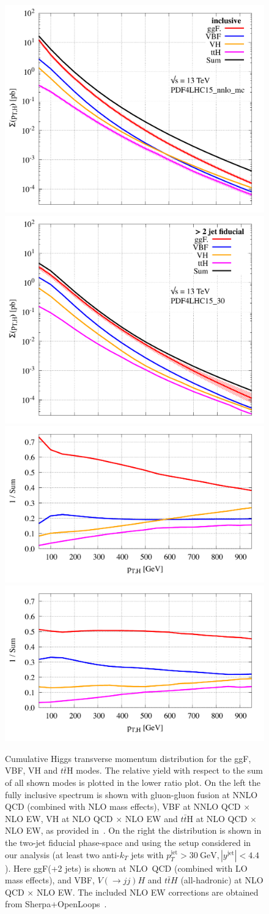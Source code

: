 \documentclass[10pt,prd,fleqn,superscriptaddress,notitlepage,nofootinbib,preprintnumbers,nobalancelastpage]{revtex4-1}
\newcommand{\VBF}{VBF\xspace}
\newcommand{\VH}{VH\xspace}
\begin{document}
\begin{figure}[t!]
\centering
\includegraphics[width=.45\textwidth]{figures/pTH_incl.pdf}
\includegraphics[width=.45\textwidth]{figures/pTH_fid.pdf}
\\\vspace{-1.1em}
\includegraphics[width=.45\textwidth]{figures/pTH_incl-ratio.pdf}
\includegraphics[width=.45\textwidth]{figures/pTH_fid-ratio.pdf}
\caption{Cumulative Higgs transverse momentum distribution for the ggF, \VBF, \VH and $t\bar{t}$H modes. The relative yield with respect to the sum of all shown modes is plotted in the lower ratio plot. On the left the fully inclusive spectrum is shown with gluon-gluon fusion at NNLO QCD (combined with NLO mass effects), \VBF at NNLO QCD $\times$ NLO EW, \VH at NLO QCD $\times$ NLO EW and $t\bar{t}$H at NLO QCD $\times$ NLO EW, as provided in~\cite{Becker:2020rjp}. On the right the
distribution is shown in the two-jet fiducial phase-space and using the setup considered in our analysis (at least two anti-$k_T$ jets with $p_T^{\text{jet}} > 30\ \text{GeV},  |y^{\text{jet}}|<4.4$). Here ggF(+2 jets) is shown at NLO~QCD (combined with LO mass effects), and \VBF, $V(\to jj)H$ and $t\bar{t}H$ (all-hadronic) at NLO QCD $\times$ NLO EW. The included NLO EW corrections are obtained from Sherpa+OpenLoops~\cite{Gleisberg:2008ta,Kallweit:2014xda,Schonherr:2017qcj,Buccioni:2019sur}. }
\label{fig:rel_fraction}
\end{figure}
\end{document}
